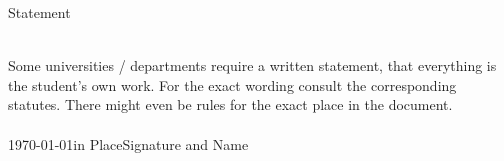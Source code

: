 \thispagestyle{empty}
\begin{center}
{\Large Statement}
\end{center}
\ \\
Some universities / departments require a written statement, that everything is the student's own work. For the exact wording consult the corresponding statutes. There might even be rules for the exact place in the document.\\
\ \\
\today in Place\hfill Signature and Name\\
